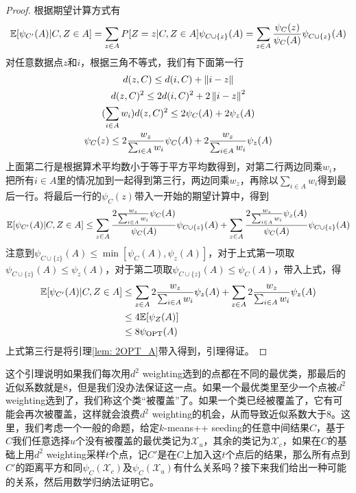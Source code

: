 \begin{proof}
    根据期望计算方式有
    \begin{equation}
        \mathbb{E}[\psi_{C'}(A)|C,Z \in A] = \sum_{z \in A} P[Z = z|C,Z \in A] \psi_{C\cup\{z\}}(A) = \sum_{z \in A} \frac{\psi_C(z)}{\psi_C(A)} \psi_{C\cup\{z\}}(A)
    \end{equation}
    对任意数据点$z$和$i$，根据三角不等式，我们有下面第一行
    \begin{gather}
        d(z,C) \leq d(i,C) + \left\lVert i-z\right\rVert \\
        d(z,C)^2 \leq 2d(i,C)^2 + 2\left\lVert i-z\right\rVert^2 \\
        (\sum_{i \in A} w_i) d(z,C)^2 \leq 2\psi_C(A) + 2\psi_z(A) \\
        \psi_C(z) \leq 2\frac{w_z}{\sum_{i \in A}w_i} \psi_C(A) + 2\frac{w_z}{\sum_{i \in A}w_i} \psi_z(A)
    \end{gather}
    上面第二行是根据算术平均数小于等于平方平均数得到，对第二行两边同乘$w_i$，把所有$i\in A$里的情况加到一起得到第三行，两边同乘$w_z$，再除以$\sum_{i \in A}w_i$得到最后一行。将最后一行的$\psi_C(z)$带入一开始的期望计算中，得到
    \begin{equation}
        \mathbb{E}[\psi_{C'}(A)|C,Z \in A] \leq \sum_{z \in A} \frac{2\frac{w_z}{\sum_{i \in A}w_i} \psi_C(A)}{\psi_C(A)} \psi_{C\cup\{z\}}(A) + \sum_{z \in A} \frac{2\frac{w_z}{\sum_{i \in A}w_i} \psi_z(A)}{\psi_C(A)} \psi_{C\cup\{z\}}(A)
    \end{equation}
    注意到$\psi_{C\cup\{z\}}(A) \leq \min[\psi_C(A),\psi_z(A)]$，对于上式第一项取$\psi_{C\cup\{z\}}(A) \leq \psi_z(A)$，对于第二项取$\psi_{C\cup\{z\}}(A) \leq \psi_C(A)$，带入上式，得
    \begin{align}
        \mathbb{E}[\psi_{C'}(A)|C,Z \in A] &\leq \sum_{z \in A} 2\frac{w_z}{\sum_{i \in A}w_i} \psi_z(A) + \sum_{z \in A} 2\frac{w_z}{\sum_{i \in A}w_i} \psi_z(A) \\
        &\leq 4 \mathbb{E}[\psi_Z(A)] \\
        &\leq 8 \psi_{\text{OPT}}(A)
    \end{align}
    上式第三行是将引理\ref{lem: 2OPT_A}带入得到，引理得证。
\end{proof}
这个引理说明如果我们每次用$d^2$ weighting选到的点都在不同的最优类，那最后的近似系数就是8，但是我们没办法保证这一点。如果一个最优类里至少一个点被$d^2$ weighting选到了，我们称这个类“被覆盖”了。如果一个类已经被覆盖了，它有可能会再次被覆盖，这样就会浪费$d^2$ weighting的机会，从而导致近似系数大于8。这里，我们考虑一个一般的命题，给定$k$-means++ seeding的任意中间结果$C$，基于$C$我们任意选择$u$个没有被覆盖的最优类记为$\mathcal{X}_u$，其余的类记为$\mathcal{X}_c$，如果在$C$的基础上用$d^2$ weighting采样$t$个点，记$C'$是在$C$上加入这$t$个点后的结果，那么所有点到$C'$的距离平方和同$\psi_C(\mathcal{X}_c)$及$\psi_C(\mathcal{X}_u)$有什么关系吗？接下来我们给出一种可能的关系，然后用数学归纳法证明它。
